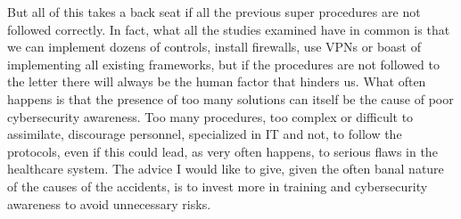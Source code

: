 But all of this takes a back seat if all the previous super procedures are not followed correctly. In fact, what all the studies examined have in common is that we can implement dozens of controls, install firewalls, use VPNs or boast of implementing all existing frameworks, but if the procedures are not followed to the letter there will always be the human factor that hinders us. What often happens is that the presence of too many solutions can itself be the cause of poor cybersecurity awareness. Too many procedures, too complex or difficult to assimilate, discourage personnel, specialized in IT and not, to follow the protocols, even if this could lead, as very often happens, to serious flaws in the healthcare system. The advice I would like to give, given the often banal nature of the causes of the accidents, is to invest more in training and cybersecurity awareness to avoid unnecessary risks.
